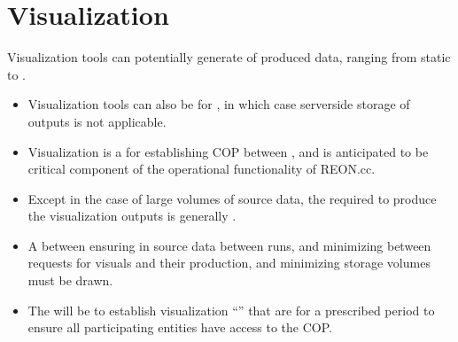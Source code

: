 \documentclass[letterpaper,12pt,english]{sphinxmanual}
\begin{document}
\section{Visualization}
\label{\detokenize{requirements/information/visualization:visualization}}\label{\detokenize{requirements/information/visualization::doc}}
\sphinxAtStartPar
Visualization tools can potentially generate  of produced data, ranging from static  to .
\begin{itemize}
\item {} 
\sphinxAtStartPar
Visualization tools can also be  for , in which case server\sphinxhyphen{}side storage of outputs is not applicable.

\item {} 
\sphinxAtStartPar
Visualization is a  for establishing COP between , and is anticipated to be critical component of the operational functionality of REON.cc.

\item {} 
\sphinxAtStartPar
Except in the case of large volumes of source data, the  required to produce the visualization outputs is generally .

\item {} 
\sphinxAtStartPar
A  between ensuring  in source data between runs, and minimizing  between requests for visuals and their production, and minimizing storage volumes must be drawn.

\item {} 
\sphinxAtStartPar
The  will be to establish visualization “” that are  for a prescribed period to ensure all participating entities have access to the COP.

\end{itemize}
\end{document}
